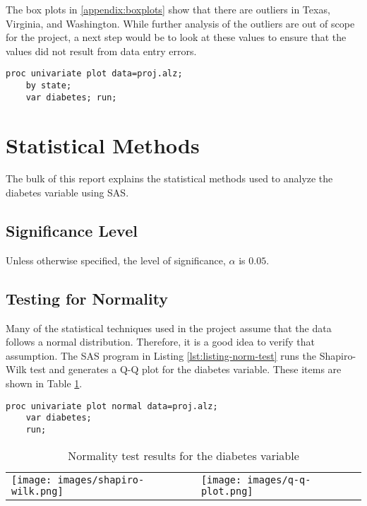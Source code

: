 \documentclass{article}
\begin{document}
The box plots in \ref{appendix:boxplots} show that there are outliers in Texas, Virginia, and Washington. While further analysis of the outliers are out of scope for the project, a next step would be to look at these values to ensure that the values did not result from data entry errors.

\begin{lstlisting}[language=SAS,caption=Box plots of the diabetes variable for each state,captionpos=b,label=lst:outliers]
    proc univariate plot data=proj.alz;
    by state;
    var diabetes; run;
\end{lstlisting}

\section{Statistical Methods}
The bulk of this report explains the statistical methods used to analyze the diabetes variable using SAS.

\subsection{Significance Level}
Unless otherwise specified, the level of significance, $\alpha$ is $0.05$.

\subsection{Testing for Normality}
Many of the statistical techniques used in the project assume that the data follows a normal distribution. Therefore, it is a good idea to verify that assumption. The SAS program in Listing \ref{lst:listing-norm-test} runs the Shapiro-Wilk test and generates a Q-Q plot for the diabetes variable. These items are shown in Table \ref{tab:norm-test}. 

\begin{lstlisting}[language=SAS,caption=SAS progam to test for the normality of the diabetes variable,captionpos=b,label=lst:listing-norm-test]
    proc univariate plot normal data=proj.alz;
    var diabetes; 
    run;
\end{lstlisting}

\begin{table}[ht]
    \begin{tabular}{ll}
         \texttt{[image: images/shapiro-wilk.png]} & \texttt{[image: images/q-q-plot.png]} \\
    \end{tabular}
    \caption{Normality test results for the diabetes variable}
    \label{tab:norm-test}
\end{table}
\end{document}
